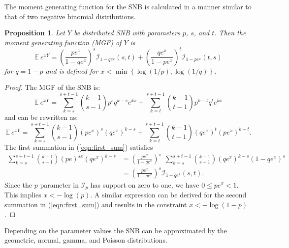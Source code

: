 \documentclass[12pt]{article}
\newtheorem{prop}{Proposition}
\begin{document}
The moment generating function for the SNB is calculated in a manner similar to 
that of two negative binomial distributions. 
\begin{prop} Let $Y$ be distributed SNB with parameters $p$, $s$, and $t$.
Then the moment generating function (MGF) of $Y$ is
\begin{equation} \label{eqn:mgf}
\mathbb{E}~e^{xY} = \left(\frac{p e^x}{1 - qe^x}\right)^s 
  \mathcal{I}_{1-qe^x} (s, t) + \left(\frac{qe^x}{1-pe^x}\right)^t 
  \mathcal{I}_{1-pe^x}(t, s)
\end{equation}
for $q = 1-p$ and is defined for 
$x < \min \left\{\log(1/p), \log(1/q) \right\}$.
\end{prop}
\begin{proof}
The MGF of the SNB is:
\begin{equation*}
\mathbb{E}~e^{xY} = \sum_{k=s}^{s+t-1} {k-1 \choose s-1} p^s q^{k-s} e^{kx} 
  + \sum_{k=t}^{s+t-1} {k-1 \choose t-1} p^{k-t} q^t e^{kx}
\end{equation*}
and can be rewritten as:
\begin{equation} \label{eqn:first_sum}
\mathbb{E}~e^{xY} = \sum_{k=s}^{s+t-1}{k-1 \choose s-1} (pe^x)^{s} (qe^x)^{k-s} 
  + \sum_{k=t}^{s+t-1}{k-1 \choose t-1} (qe^x)^t (pe^x)^{k-t}.
\end{equation}
The first summation in (\ref{eqn:first_sum}) satisfies
\begin{align*}
\sum_{k=s}^{s+t-1}{k-1 \choose s-1} (pe)^{sx} (qe^x)^{k-s} &= 
  \left(\frac{pe^x}{1 - qe^x}\right)^s \ \ \sum_{k=s}^{s+t-1} {k-1 \choose s-1} 
    (qe^x)^{k-s} (1-qe^x)^s \\
  &= \left(\frac{pe^x}{1 - qe^x}\right)^s \mathcal{I}_{1-qe^x}(s, t).
\end{align*}
Since the $p$ parameter in $\mathcal{I}_p$ has support on zero 
to one, we have $0 \leq pe^x < 1$. This implies $x < -\log(p)$.
A similar expression can be derived for the second summation in 
(\ref{eqn:first_sum}) and results in
the constraint $x < -\log(1-p)$.
\end{proof}

Depending on the parameter values the SNB can be approximated by 
the geometric, normal, gamma, and Poisson
distributions.
\end{document}
